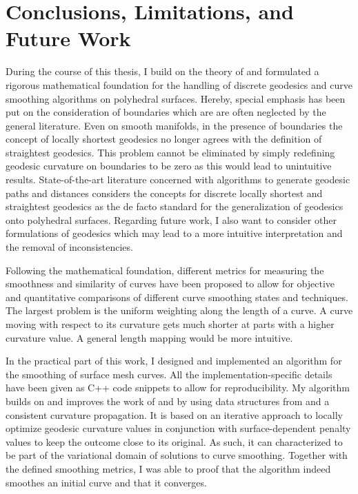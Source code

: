\documentclass[crop=false]{stdlocal}
\begin{document}
\section{Conclusions, Limitations, and Future Work} %
\label{sec:conclusions}

  During the course of this thesis, I build on the theory of \textcite{polthier2006} and formulated a rigorous mathematical foundation for the handling of discrete geodesics and curve smoothing algorithms on polyhedral surfaces.
  Hereby, special emphasis has been put on the consideration of boundaries which are are often neglected by the general literature.
  Even on smooth manifolds, in the presence of boundaries the concept of locally shortest geodesics no longer agrees with the definition of straightest geodesics.
  This problem cannot be eliminated by simply redefining geodesic curvature on boundaries to be zero as this would lead to unintuitive results.
  State-of-the-art literature concerned with algorithms to generate geodesic paths and distances considers the concepts for discrete locally shortest and straightest geodesics as the de facto standard for the generalization of geodesics onto polyhedral surfaces.
  Regarding future work, I also want to consider other formulations of geodesics which may lead to a more intuitive interpretation and the removal of inconsistencies.

  Following the mathematical foundation, different metrics for measuring the smoothness and similarity of curves have been proposed to allow for objective and quantitative comparisons of different curve smoothing states and techniques.
  The largest problem is the uniform weighting along the length of a curve.
  A curve moving with respect to its curvature gets much shorter at parts with a higher curvature value.
  A general length mapping would be more intuitive.

  In the practical part of this work, I designed and implemented an algorithm for the smoothing of surface mesh curves.
  All the implementation-specific details have been given as C++ code snippets to allow for reproducibility.
  My algorithm builds on and improves the work of \textcite{martinez2005} and \textcite{lawonn2014} by using data structures from \textcite{mancinelli2022} and a consistent curvature propagation.
  It is based on an iterative approach to locally optimize geodesic curvature values in conjunction with surface-dependent penalty values to keep the outcome close to its original.
  As such, it can characterized to be part of the variational domain of solutions to curve smoothing.
  Together with the defined smoothing metrics, I was able to proof that the algorithm indeed smoothes an initial curve and that it converges.
\end{document}
